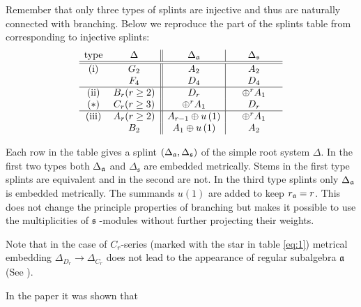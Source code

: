 \documentclass{article}
\newcommand{\sfr}{\mathfrak{s}}
\begin{document}
Remember that only three types of splints are
injective and thus are naturally connected with branching. Below we
reproduce the part of the splints table from \cite{richter2008splints} corresponding to
injective splints:
\begin{equation}
\label{eq:1}
\begin{array}{cc||c|c}
\hbox{type} & \hspace{0.25in}\Delta \hspace{0.25in} & \hspace{0.25in}\Delta
_{\frak{a}}\hspace{0.25in} & \hspace{0.25in}\Delta _{\sfr}\hspace{0.25in}
\\ \hline\hline
\hbox{(i)} & G_{2} & A_{2} & A_{2} \\
& F_{4} & D_{4} & D_{4} \\ \hline
\hbox{(ii)} & B_{r}(r\geq 2) & D_{r} & \oplus ^{r}A_{1} \\
(*)& C_{r}(r\geq 3) & \oplus ^{r}A_{1} &  D_{r} \\ \hline
\hbox{(iii)} & A_{r}(r\geq 2) & A_{r-1}\oplus u\left( 1\right)  & \oplus
^{r}A_{1} \\
& B_{2} & A_{1}\oplus u\left( 1\right)  & A_{2}
\end{array}
\end{equation}

Each row in the table gives a splint $(\Delta _{\frak{a}},\Delta _{\sfr})
$ of the simple root system $\Delta $. In the first two types both $\Delta _{%
\frak{a}}$ and $\Delta _{\sfr}$ are embedded metrically. Stems in the
first type splints are equivalent and in the second are not. In the third
type splints only $\Delta _{\frak{a}}$ is embedded metrically. The summands $%
u\left( 1\right) $ are added to keep $r_{\frak{a}}=r$. This does not change
the principle properties of branching but makes it possible to use the
multiplicities of $\sfr$ -modules without further projecting their
weights.

Note that in the case of $C_{r}$-series (marked with the star in table \eqref{eq:1}) metrical
embedding $\Delta_{D_{r}}\to \Delta_{C_{r}}$ does not lead to the appearance of regular subalgebra
$\mathfrak{a}$ (See \cite{dynkin1952semisimple}).

In the paper \cite{2011arXiv1102.1702L} it was shown that
\end{document}
